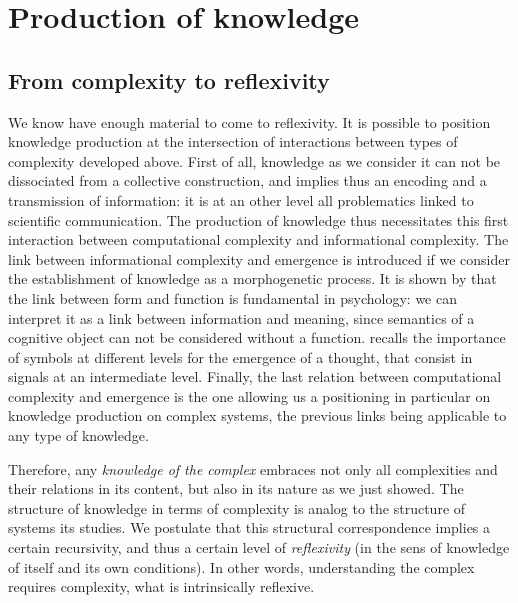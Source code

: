 \section{Production of knowledge}

\subsection{From complexity to reflexivity}

We know have enough material to come to reflexivity. It is possible to position knowledge production at the intersection of interactions between types of complexity developed above. First of all, knowledge as we consider it can not be dissociated from a collective construction, and implies thus an encoding and a transmission of information: it is at an other level all problematics linked to scientific communication. The production of knowledge thus necessitates this first interaction between computational complexity and informational complexity. The link between informational complexity and emergence is introduced if we consider the establishment of knowledge as a morphogenetic process. It is shown by \cite{antelope2016interdisciplinary} that the link between form and function is fundamental in psychology: we can interpret it as a link between information and meaning, since semantics of a cognitive object can not be considered without a function. \cite{hofstadter1980godel} recalls the importance of symbols at different levels for the emergence of a thought, that consist in signals at an intermediate level. Finally, the last relation between computational complexity and emergence is the one allowing us a positioning in particular on knowledge production on complex systems, the previous links being applicable to any type of knowledge.

Therefore, any \emph{knowledge of the complex} embraces not only all complexities and their relations in its content, but also in its nature as we just showed. The structure of knowledge in terms of complexity is analog to the structure of systems its studies. We postulate that this structural correspondence implies a certain recursivity, and thus a certain level of \emph{reflexivity} (in the sens of knowledge of itself and its own conditions). In other words, understanding the complex requires complexity, what is intrinsically reflexive.


%

